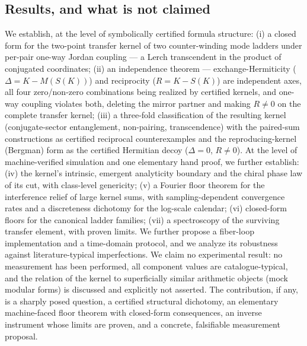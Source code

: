 \documentclass[11pt,a4paper]{article}
\begin{document}
\subsection{Results, and what is not claimed}

We establish, at the level of symbolically certified formula structure: (i) a
closed form for the two-point transfer kernel of two counter-winding mode
ladders under per-pair one-way Jordan coupling --- a Lerch transcendent in the
product of conjugated coordinates; (ii) an independence theorem --- exchange-Hermiticity
($\Delta = K - M(S(K))$) and reciprocity ($R = K - S(K)$) are independent
axes, all four zero/non-zero combinations being realized by certified
kernels, and
one-way coupling violates both, deleting the mirror partner and making
$R \neq 0$ on the complete transfer kernel; (iii) a three-fold classification of the
resulting kernel (conjugate-sector entanglement, non-pairing, transcendence)
with the paired-sum constructions as certified reciprocal counterexamples
and the reproducing-kernel (Bergman) form as the certified Hermitian decoy
($\Delta = 0$, $R \neq 0$). At the level of machine-verified simulation and one elementary hand proof, we further establish: (iv) the kernel's intrinsic, emergent analyticity boundary and the chiral phase law of its cut, with class-level genericity; (v) a Fourier floor theorem for the interference relief of large kernel sums, with sampling-dependent convergence rates and a discreteness dichotomy for the log-scale calendar; (vi) closed-form floors for the canonical ladder families; (vii) a spectroscopy of the surviving transfer element, with proven limits. We further propose a fiber-loop
implementation and a time-domain protocol, and we analyze its robustness
against literature-typical imperfections. We claim no experimental result: no
measurement has been performed, all component values are catalogue-typical, and
the relation of the kernel to superficially similar arithmetic objects (mock
modular forms) is discussed and explicitly not asserted. The contribution, if
any, is a sharply posed question, a certified structural dichotomy, an elementary machine-faced floor theorem with closed-form consequences, an inverse instrument whose limits are proven, and a
concrete, falsifiable measurement proposal.
\end{document}
